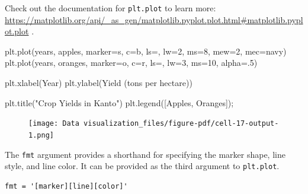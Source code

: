 \documentclass[
  letterpaper,
  DIV=11,
  numbers=noendperiod]{scrreprt}
\newenvironment{Shaded}{\begin{snugshade}}{\end{snugshade}}
\newcommand{\DecValTok}[1]{\textcolor[rgb]{0.68,0.00,0.00}{#1}}
\newcommand{\FloatTok}[1]{\textcolor[rgb]{0.68,0.00,0.00}{#1}}
\newcommand{\NormalTok}[1]{\textcolor[rgb]{0.00,0.23,0.31}{#1}}
\newcommand{\OperatorTok}[1]{\textcolor[rgb]{0.37,0.37,0.37}{#1}}
\newcommand{\StringTok}[1]{\textcolor[rgb]{0.13,0.47,0.30}{#1}}
\begin{document}
Check out the documentation for \texttt{plt.plot} to learn more:
\url{https://matplotlib.org/api/_as_gen/matplotlib.pyplot.plot.html\#matplotlib.pyplot.plot}
.

\begin{Shaded}
\begin{Highlighting}[]
\NormalTok{plt.plot(years, apples, marker}\OperatorTok{=}\StringTok{\textquotesingle{}s\textquotesingle{}}\NormalTok{, c}\OperatorTok{=}\StringTok{\textquotesingle{}b\textquotesingle{}}\NormalTok{, ls}\OperatorTok{=}\StringTok{\textquotesingle{}{-}\textquotesingle{}}\NormalTok{, lw}\OperatorTok{=}\DecValTok{2}\NormalTok{, ms}\OperatorTok{=}\DecValTok{8}\NormalTok{, mew}\OperatorTok{=}\DecValTok{2}\NormalTok{, mec}\OperatorTok{=}\StringTok{\textquotesingle{}navy\textquotesingle{}}\NormalTok{)}
\NormalTok{plt.plot(years, oranges, marker}\OperatorTok{=}\StringTok{\textquotesingle{}o\textquotesingle{}}\NormalTok{, c}\OperatorTok{=}\StringTok{\textquotesingle{}r\textquotesingle{}}\NormalTok{, ls}\OperatorTok{=}\StringTok{\textquotesingle{}{-}{-}\textquotesingle{}}\NormalTok{, lw}\OperatorTok{=}\DecValTok{3}\NormalTok{, ms}\OperatorTok{=}\DecValTok{10}\NormalTok{, alpha}\OperatorTok{=}\FloatTok{.5}\NormalTok{)}

\NormalTok{plt.xlabel(}\StringTok{\textquotesingle{}Year\textquotesingle{}}\NormalTok{)}
\NormalTok{plt.ylabel(}\StringTok{\textquotesingle{}Yield (tons per hectare)\textquotesingle{}}\NormalTok{)}

\NormalTok{plt.title(}\StringTok{"Crop Yields in Kanto"}\NormalTok{)}
\NormalTok{plt.legend([}\StringTok{\textquotesingle{}Apples\textquotesingle{}}\NormalTok{, }\StringTok{\textquotesingle{}Oranges\textquotesingle{}}\NormalTok{])}\OperatorTok{;}
\end{Highlighting}
\end{Shaded}

\begin{figure}[H]

{\centering \texttt{[image: Data visualization\_files/figure-pdf/cell-17-output-1.png]}

}

\end{figure}

The \texttt{fmt} argument provides a shorthand for specifying the marker
shape, line style, and line color. It can be provided as the third
argument to \texttt{plt.plot}.

\begin{verbatim}
fmt = '[marker][line][color]'
\end{verbatim}
\end{document}
